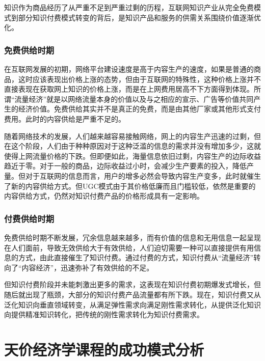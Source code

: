 \documentclass[UTF8,a4paper,12pt]{ctexart}  %
\begin{document}
知识作为商品经历了从严重不足到严重过剩的历程，互联网知识产业从完全免费模式到部分知识付费模式转变的背后，是知识产品和服务的供需关系围绕价值逐渐优化。

\hypertarget{section-12}{%
\subsubsection{免费供给时期}\label{section-12}}

在互联网发展的初期，网络平台建设速度是高于内容生产的速度，如果是普通的商品，这时应该表现出价格上涨的态势，但由于互联网的特殊性，这种价格上涨并不直接表现在获取网上知识的价格上涨，而是在上网费用居高不下方面得到体现。所谓``流量经济''就是以网络流量本身的价值以及与之相应的宣示、广告等价值共同产生的经济价值。免费供给其实并不是真正的免费，而是由其他厂家或其他形式支付费用。此时的内容供给是严重不足的。

随着网络技术的发展，人们越来越容易接触网络，网上的内容生产迅速的过剩，但在这个阶段，人们由于种种原因对于这种泛滥的信息的需求并没有增加多少，这就使得上网流量价格的下跌。但即便如此，海量信息依旧过剩，内容生产的边际收益趋近于零。对于一般的商品，边际收益过小时，会减少生产要素的投入，降低产量。但对于互联网的信息而言，用户的增多必然会导致内容生产变多，此时就催生了新的内容供给方式。但UGC模式由于其价格低廉而且门槛较低，依然是重要的内容供给方式，仍然对知识付费产品的价格形成具有一定影响。

\hypertarget{section-13}{%
\subsubsection{付费供给时期}\label{section-13}}

免费供给时期不断发展，冗余信息越来越多，而有价值的信息和无用信息一起呈现在人们面前，导致无效供给大于有效供给，人们迫切需要一种可以直接提供有用信息的方式，由此直接催生了知识付费。通过付费的方式，知识付费从``流量经济''转向了``内容经济''，迅速弥补了有效供给的不足。

但知识付费阶段并未能刺激出更多的需求，这表现在知识付费初期爆发式增长，但随后就出现了瓶颈，大部分的知识付费产品流量都有所下跌。现在，知识付费又从泛化知识向垂直领域转变，从满足弹性需求向满足刚性需求转化，从提供泛化知识向提供精准知识转化，把传统的刚性需求转化为知识付费需求。

\hypertarget{section-14}{%
\section{天价经济学课程的成功模式分析}\label{section-14}}
\end{document}
